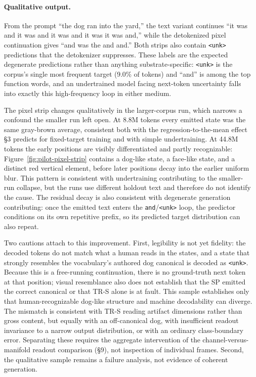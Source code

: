 \documentclass[11pt,a4paper]{article}
\begin{document}
\paragraph{Qualitative output.} From the prompt ``the dog ran into the yard,'' the text variant continues ``it was and it was and it was and it was it was and,'' while the detokenized pixel continuation gives ``and was the and and.'' Both strips also contain \texttt{<unk>} predictions that the detokenizer suppresses. These labels are the expected degenerate predictions rather than anything substrate-specific: \texttt{<unk>} is the corpus's single most frequent target (9.0\% of tokens) and ``and'' is among the top function words, and an undertrained model facing next-token uncertainty falls into exactly this high-frequency loop in either medium.

The pixel strip changes qualitatively in the larger-corpus run, which narrows a confound the smaller run left open. At 8.8M tokens every emitted state was the same gray-brown average, consistent both with the regression-to-the-mean effect §3 predicts for fixed-target training and with simple undertraining. At 44.8M tokens the early positions are visibly differentiated and partly recognizable: Figure~\ref{fig:pilot-pixel-strip} contains a dog-like state, a face-like state, and a distinct red vertical element, before later positions decay into the earlier uniform blur. This pattern is consistent with undertraining contributing to the smaller-run collapse, but the runs use different holdout text and therefore do not identify the cause. The residual decay is also consistent with degenerate generation contributing: once the emitted text enters the \texttt{and}/\texttt{<unk>} loop, the predictor conditions on its own repetitive prefix, so its predicted target distribution can also repeat.

Two cautions attach to this improvement. First, legibility is not yet fidelity: the decoded tokens do not match what a human reads in the states, and a state that strongly resembles the vocabulary's authored dog canonical is decoded as \texttt{<unk>}. Because this is a free-running continuation, there is no ground-truth next token at that position; visual resemblance also does not establish that the SP emitted the correct canonical or that TR-S alone is at fault. This sample establishes only that human-recognizable dog-like structure and machine decodability can diverge. The mismatch is consistent with TR-S reading artifact dimensions rather than gross content, but equally with an off-canonical dog, with insufficient readout invariance to a narrow output distribution, or with an ordinary class-boundary error. Separating these requires the aggregate intervention of the channel-versus-manifold readout comparison (§9), not inspection of individual frames. Second, the qualitative sample remains a failure analysis, not evidence of coherent generation.
\end{document}
